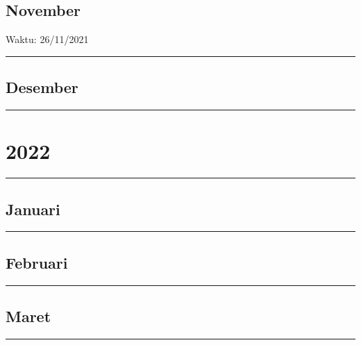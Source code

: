 \documentclass[
]{book}
\begin{document}
\hypertarget{november}{%
\subsection{November}\label{november}}

Waktu: 26/11/2021

\begin{center}\rule{0.5\linewidth}{0.5pt}\end{center}

\hypertarget{desember}{%
\subsection{Desember}\label{desember}}

\begin{center}\rule{0.5\linewidth}{0.5pt}\end{center}

\hypertarget{section-1}{%
\section{2022}\label{section-1}}

\begin{center}\rule{0.5\linewidth}{0.5pt}\end{center}

\hypertarget{januari}{%
\subsection{Januari}\label{januari}}

\begin{center}\rule{0.5\linewidth}{0.5pt}\end{center}

\hypertarget{februari}{%
\subsection{Februari}\label{februari}}

\begin{center}\rule{0.5\linewidth}{0.5pt}\end{center}

\hypertarget{maret}{%
\subsection{Maret}\label{maret}}

\begin{center}\rule{0.5\linewidth}{0.5pt}\end{center}
\end{document}
